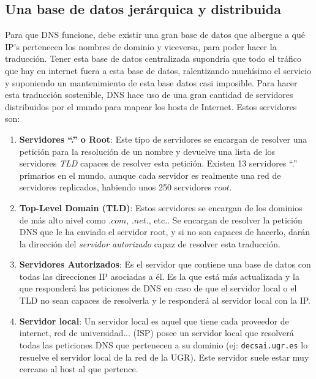\documentclass[10pt,a4paper,spanish]{report}
\begin{document}
\subsection{\textcolor{tema2}Una base de datos jerárquica y distribuida}
\label{bdjd}

Para que DNS funcione, debe existir una gran base de datos que albergue a qué IP's pertenecen los nombres de dominio y viceversa, para poder hacer la traducción. Tener esta base de datos centralizada supondría que todo el tráfico que hay en internet fuera a esta base de datos, ralentizando muchísimo el servicio y suponiendo un mantenimiento de esta base datos casi imposible. Para hacer esta traducción sostenible, DNS hace uso de una gran cantidad de servidores distribuidos por el mundo para mapear los hosts de Internet. Estos servidores son:

\begin{enumerate}[\color{tema2}{$\rightarrow$}]
  \item \textbf{\textcolor{tema2}{Servidores ``.'' o Root}}: Este tipo de servidores se encargan de resolver una petición para la resolución de un nombre y devuelve una lista de los servidores \textit{\textcolor{tema2}{TLD}} capaces de resolver esta petición. Existen 13 servidores ``.'' primarios en el mundo, aunque cada servidor es realmente una red de servidores replicados, habiendo unos 250 servidores $root$.
  \item \textbf{\textcolor{tema2}{Top-Level Domain (TLD)}}: Estos servidores se encargan de los dominios de más alto nivel como $.com$, $.net.$, etc.. Se encargan de resolver la petición DNS que le ha enviado el servidor root, y si no son capaces de hacerlo, darán la dirección del \textit{\textcolor{tema2}{servidor autorizado}} capaz de resolver esta traducción. 
  \item \textbf{\textcolor{tema2}{Servidores Autorizados}}: Es el servidor que contiene una base de datos con todas las direcciones IP asociadas a él. Es la que está más actualizada y la que responderá las peticiones de DNS en caso de que el servidor local o el TLD no sean capaces de resolverla y le responderá al servidor local con la IP.
  \item \textbf{\textcolor{tema2}{Servidor local}}: Un servidor local es aquel que tiene cada proveedor de internet, red de universidad... (ISP) posee un servidor local que resolverá todas las peticiones DNS que pertenecen a su dominio (ej: \verb|decsai.ugr.es| lo resuelve el servidor local de la red de la UGR). Este servidor suele estar muy cercano al host al que pertence.
\end{enumerate}
\end{document}
